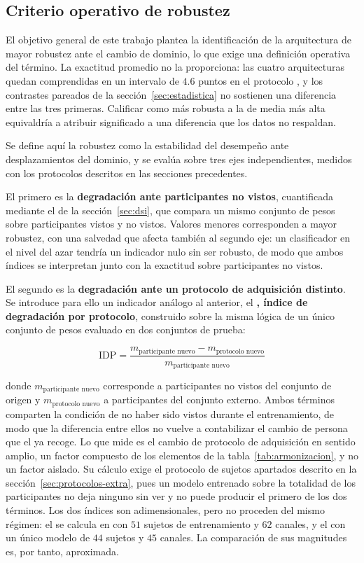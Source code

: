 \subsection{Criterio operativo de robustez}
\label{sec:criterio-robustez}

El objetivo general de este trabajo plantea la identificación de la arquitectura de mayor
robustez ante el cambio de dominio, lo que exige una definición operativa del término. La
exactitud promedio no la proporciona: las cuatro arquitecturas quedan comprendidas en un
intervalo de $4.6$ puntos en el protocolo \loso{}, y los contrastes pareados de la
sección~\ref{sec:estadistica} no sostienen una diferencia entre las tres primeras.
Calificar como más robusta a la de media más alta equivaldría a atribuir significado a una
diferencia que los datos no respaldan.

Se define aquí la robustez como la estabilidad del desempeño ante desplazamientos del
dominio, y se evalúa sobre tres ejes independientes, medidos con los protocolos descritos
en las secciones precedentes.

El primero es la \textbf{degradación ante participantes no vistos}, cuantificada mediante
el \dsi{} de la sección~\ref{sec:dsi}, que compara un mismo conjunto de pesos sobre
participantes vistos y no vistos. Valores menores corresponden a mayor robustez, con una
salvedad que afecta también al segundo eje: un clasificador en el nivel del azar tendría un
indicador nulo sin ser robusto, de modo que ambos índices se interpretan junto con la
exactitud sobre participantes no vistos.

El segundo es la \textbf{degradación ante un protocolo de adquisición distinto}. Se
introduce para ello un indicador análogo al anterior, el \textbf{\idp{}, índice de
degradación por protocolo}, construido sobre la misma lógica de un único conjunto de pesos
evaluado en dos conjuntos de prueba:

\begin{equation}
\mathrm{IDP} =
  \frac{m_{\text{participante nuevo}} - m_{\text{protocolo nuevo}}}
       {m_{\text{participante nuevo}}}
\label{eq:idp}
\end{equation}

donde $m_{\text{participante nuevo}}$ corresponde a participantes no vistos del conjunto de
origen y $m_{\text{protocolo nuevo}}$ a participantes del conjunto externo. Ambos términos
comparten la condición de no haber sido vistos durante el entrenamiento, de modo que la
diferencia entre ellos no vuelve a contabilizar el cambio de persona que el \dsi{} ya recoge.
Lo que mide es el cambio de protocolo de adquisición en sentido amplio, un factor compuesto
de los elementos de la tabla~\ref{tab:armonizacion}, y no un factor aislado. Su cálculo exige el protocolo de sujetos apartados descrito
en la sección~\ref{sec:protocolos-extra}, pues un modelo entrenado sobre la totalidad de los
participantes no deja ninguno sin ver y no puede producir el primero de los dos términos.
Los dos índices son adimensionales, pero no proceden del mismo régimen: el \dsi{} se calcula
en \loso{} con $51$ sujetos de entrenamiento y $62$ canales, y el \idp{} con un único modelo
de $44$ sujetos y $45$ canales. La comparación de sus magnitudes es, por tanto, aproximada.

